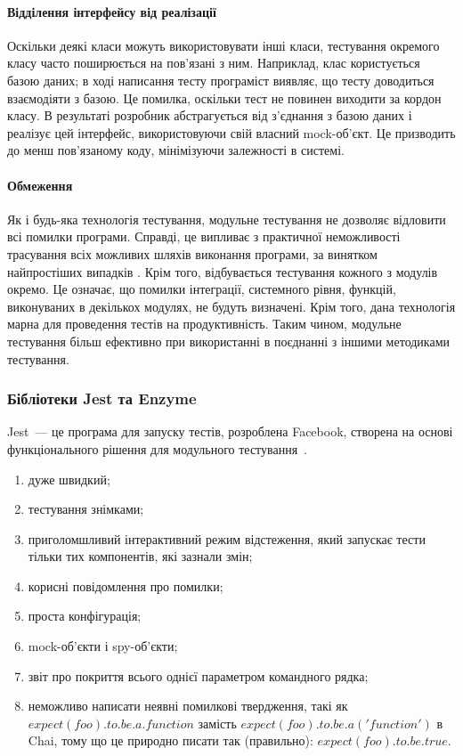 \paragraph{Відділення інтерфейсу від реалізації}

Оскільки деякі класи можуть використовувати інші класи, тестування окремого класу часто поширюється на пов'язані з ним. Наприклад, клас користується базою даних; в ході написання тесту програміст виявляє, що тесту доводиться взаємодіяти з базою. Це помилка, оскільки тест не повинен виходити за кордон класу. В результаті розробник абстрагується від з'єднання з базою даних і реалізує цей інтерфейс, використовуючи свій власний mock-об'єкт. Це призводить до менш пов'язаному коду, мінімізуючи залежності в системі.

\paragraph{Обмеження}

Як і будь-яка технологія тестування, модульне тестування не дозволяє відловити всі помилки програми. Справді, це випливає з практичної неможливості трасування всіх можливих шляхів виконання програми, за винятком найпростіших випадків \cite{бородіна2018selenium}. Крім того, відбувається тестування кожного з модулів окремо. Це означає, що помилки інтеграції, системного рівня, функцій, виконуваних в декількох модулях, не будуть визначені. Крім того, дана технологія марна для проведення тестів на продуктивність. Таким чином, модульне тестування більш ефективно при використанні в поєднанні з іншими методиками тестування.

\subsubsection{Бібліотеки Jest та Enzyme}

Jest~--- це програма для запуску тестів, розроблена Facebook, створена на основі функціонального рішення для модульного тестування~\cite{9781680506464}.

\begin{enumerate}
    \item дуже швидкий;
    \item тестування знімками;
    \item приголомшливий інтерактивний режим відстеження, який запускає тести тільки тих компонентів, які зазнали змін;
    \item корисні повідомлення про помилки;
    \item проста конфігурація;
    \item mock-об'єкти і spy-об'єкти;
    \item звіт про покриття всього однієї параметром командного рядка;
    \item неможливо написати неявні помилкові твердження, такі як $expect(foo).to.be.a.function$ замість $expect(foo). to.be.a( 'function')$ в Chai, тому що це природно писати так (правильно): $expect(foo).to.be.true.$
\end{enumerate}

